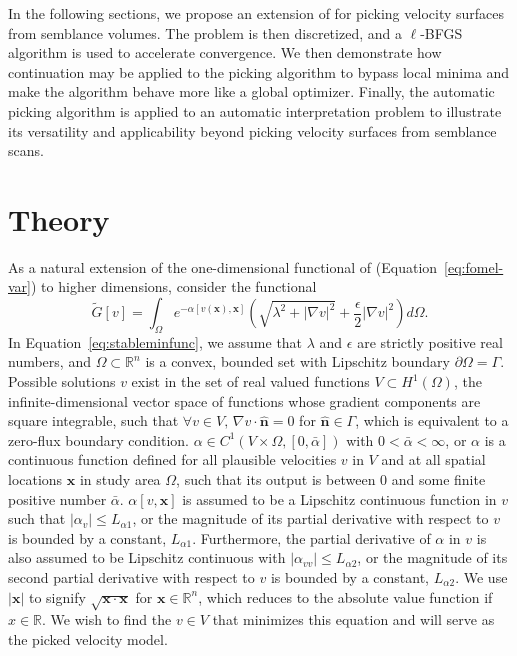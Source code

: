 In the following sections, we propose an extension of \cite{fomelvelanal} for picking velocity surfaces from semblance volumes. The problem is then discretized, and a $\ell$-BFGS algorithm is used to accelerate convergence. We then demonstrate how continuation may be applied to the picking algorithm to bypass local minima and make the algorithm behave more like a global optimizer.  Finally, the automatic picking algorithm is applied to an automatic interpretation problem to illustrate its versatility and applicability beyond picking velocity surfaces from semblance scans.

\section{Theory}

As a natural extension of the one-dimensional functional of \cite{fomelvelanal}  (Equation~\ref{eq:fomel-var}) to higher dimensions, consider the functional
\begin{equation}
    \label{eq:stableminfunc}
        \tilde{G}[v] = \int_\Omega e^{-\alpha[v(\mathbf{x}),\mathbf{x}]}\left( \sqrt{\lambda^2+\left|\nabla v\right|^2} + \frac{\epsilon}{2} \left| \nabla v \right|^2 \right)d\Omega.
\end{equation}
In Equation~\ref{eq:stableminfunc}, we assume that $\lambda$ and $\epsilon$ are strictly positive real numbers, and $\Omega \subset \mathbb{R}^n$ is a convex, bounded set with Lipschitz boundary $\partial \Omega = \Gamma$. Possible solutions $v$ exist in the set of real valued functions $V \subset H^1(\Omega)$, the infinite-dimensional vector space of functions whose gradient components are square integrable, such that $\forall v \in V, \, \nabla v \cdot \hat{\mathbf{n}} = 0$ for $\hat{\mathbf{n}} \in \Gamma$, which is equivalent to a zero-flux boundary condition. $\alpha \in C^1(V\times \Omega, [0,\bar{\alpha}])$ with $0<\bar{\alpha}<
\infty$, or $\alpha$ is a continuous function defined for all plausible velocities $v$ in $V$ and at all spatial locations $\mathbf{x}$ in study area $\Omega$, such that its output is between $0$ and some finite positive number $\bar{\alpha}$.  $\alpha[v,\mathbf{x}]$ is assumed to be a Lipschitz continuous function in $v$ such that $\left| \alpha_v \right| \leq L_{\alpha 1}$, or the magnitude of its partial derivative with respect to $v$ is bounded by a constant, $L_{\alpha 1}$. Furthermore, the partial derivative of $\alpha$ in $v$ is also assumed to be Lipschitz continuous with $\left| \alpha_{vv} \right| \leq L_{\alpha 2}$, or the magnitude of its second partial derivative with respect to $v$ is bounded by a constant, $L_{\alpha 2}$.  We use $\left| \mathbf{x} \right|$ to signify $\sqrt{\mathbf{x} \cdot \mathbf{x}}$ for $\mathbf{x} \in \mathbb{R}^n$, which reduces to the absolute value function if $x\in \mathbb{R}$.  We wish to find the $v \in V$ that minimizes this equation and will serve as the picked velocity model.

